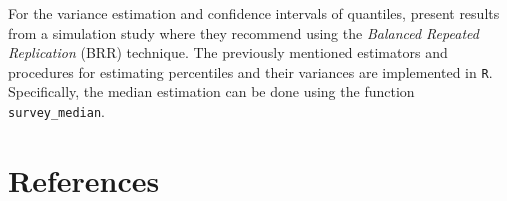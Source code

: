 \documentclass[
  12pt,
]{book}
\begin{document}
For the variance estimation and confidence intervals of quantiles, \citet{kovar1988bootstrap} present results from a simulation study where they recommend using the \emph{Balanced Repeated Replication} (BRR) technique. The previously mentioned estimators and procedures for estimating percentiles and their variances are implemented in \texttt{R}. Specifically, the median estimation can be done using the function \texttt{survey\_median}.

\chapter*{References}\label{references}

  
\end{document}
